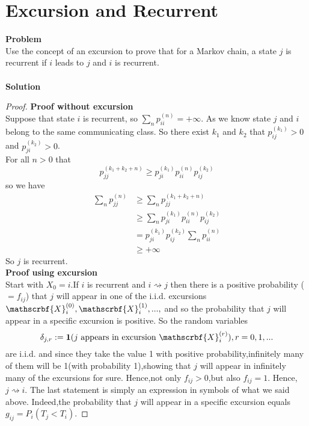 	\section{Excursion and Recurrent}
	\textbf{Problem}\\
	Use the concept of an excursion to prove that for a Markov chain, a state $j$ is recurrent if $i$ leads to $j$ and $i$ is recurrent.\\\\
	\textbf{Solution}\\
	\begin{proof}
		\textbf{Proof without excursion}\\
	Suppose that state $i$ is recurrent, so $\sum_n p_{ii}^{(n)} = +\infty$. As we know state $j$ and $i$ belong to the same communicating class. So there exist $k_1$ and $k_2$ that $p_{ij}^{(k_1)} >0$ and $p_{ji}^{(k_2)} >0$.\\
	For all $n>0$ that
	\begin{equation*}
		p_{jj}^{(k_1+k_2+n)} \ge p_{ji}^{(k_1)} p_{ii}^{(n)} p_{ij}^{(k_2)}
	\end{equation*}
	so we have
	\begin{equation*}
		\begin{split}
			\sum_n p_{jj}^{(n)} &\ge \sum_n p_{jj}^{(k_1+k_2+n)} \\
			&\ge \sum_n p_{ji}^{(k_1)} p_{ii}^{(n)} p_{ij}^{(k_2)} \\
			&= p_{ji}^{(k_1)} p_{ij}^{(k_2)} \sum_n p_{ii}^{(n)} \\
			&\ge +\infty
		\end{split}
	\end{equation*}
	So $j$ is recurrent.\\
	\textbf{Proof using excursion}\\
	Start with $X_0=i$.If $i$ is recurrent and $i\rightsquigarrow j$ then there is a positive probability ($=f_{ij}$) that $j$ will appear in one of the i.i.d. excursions $\mathscrbf{X}^{(0)}_i,\mathscrbf{X}^{(1)}_i,...,$ and so the probability that $j$ will appear in a specific excursion is positive. So the random variables
	\[
	\delta_{j,r} := \mathbf{1}(j \text{\ appears in excursion\ } \mathscrbf{X}^{(r)}_i),r=0,1,...
	\]
	are i.i.d. and since they take the value 1 with positive probability,infinitely many of them will be 1(with probability 1),showing that $j$ will appear in infinitely many of the excursions for sure. Hence,not only $f_{ij} > 0$,but also $f_{ij}=1$. Hence,$j \rightsquigarrow i$. The last statement is simply an expression in symbols of what we said above. Indeed,the probability that $j$ will appear in a specific excursion equals $g_{ij}=P_{i}(T_j<T_i)$.
	\end{proof}
	
